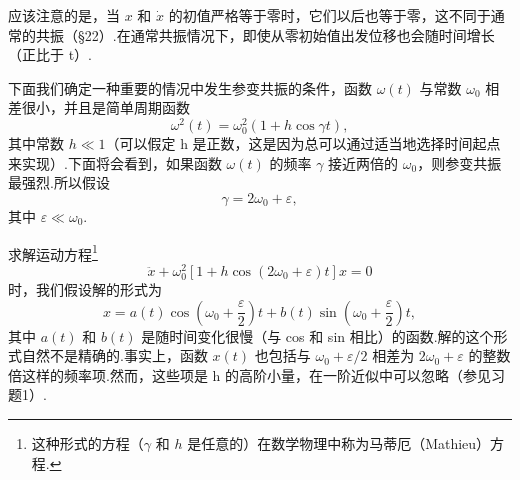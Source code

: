 应该注意的是，当 $x$ 和 $\dot{x}$ 的初值严格等于零时，它们以后也等于零，这不同于通常的共振（§22）.在通常共振情况下，即使从零初始值出发位移也会随时间增长（正比于 t）.

下面我们确定一种重要的情况中发生参变共振的条件，函数 $\omega(t)$ 与常数 $\omega_0$ 相差很小，并且是简单周期函数
\begin{equation}
  \omega^2(t)=\omega_0^2\left(1+h\cos\gamma t\right),
\end{equation}
其中常数 $h\ll1$（可以假定 h 是正数，这是因为总可以通过适当地选择时间起点来实现）.下面将会看到，如果函数 $\omega(t)$ 的频率 $\gamma$ 接近两倍的 $\omega_0$，则参变共振最强烈.所以假设
\begin{equation*}
  \gamma=2\omega_0+\varepsilon,
\end{equation*}
其中 $\varepsilon\ll\omega_0$.

求解运动方程\footnote{这种形式的方程（$\gamma$ 和 $h$ 是任意的）在数学物理中称为马蒂厄（Mathieu）方程.}
\begin{equation}
  \ddot{x}+\omega_0^2\left[1+h\cos\left(2\omega_0+\varepsilon\right)t\right]x=0
\end{equation}
时，我们假设解的形式为
\begin{equation}
  x=a(t)\cos\left(\omega_0+\frac{\varepsilon}{2}\right)t
  +b(t)\sin\left(\omega_0+\frac{\varepsilon}{2}\right)t,
\end{equation}
其中 $a(t)$ 和 $b(t)$ 是随时间变化很慢（与 cos 和 sin 相比）的函数.解的这个形式自然不是精确的.事实上，函数 $x(t)$ 也包括与 $\omega_0+\varepsilon/2$ 相差为 $2\omega_0+\varepsilon$ 的整数倍这样的频率项.然而，这些项是 h 的高阶小量，在一阶近似中可以忽略（参见习题1）.

